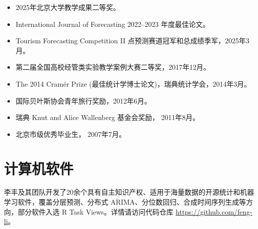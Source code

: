 \documentclass[twoside,a4paper,11pt]{article}
\begin{document}
\begin{refsection}
\begin{itemize}
\item 2025年北京大学教学成果二等奖。
\item International Journal of Forecasting 2022--2023 年度最佳论文。
\item Tourism Forecasting Competition II 点预测赛道冠军和总成绩季军，2025年3月。
\item 第二届全国高校经管类实验教学案例大赛二等奖，2017年12月。
\item The 2014 Cramér Prize (最佳统计学博士论文)，瑞典统计学会，2014年3月。
\item 国际贝叶斯协会青年旅行奖励，2012年6月。
\item 瑞典 Knut and Alice Wallenberg 基金会奖励， 2011年8月。
\item 北京市级优秀毕业生， 2007年7月。
\end{itemize}

\section{计算机软件}
李丰及其团队开发了20余个具有自主知识产权、适用于海量数据的开源统计和机器学习软件，覆盖分层预测、分布式 ARIMA、分位数回归、合成时间序列生成等方向，部分软件入选 R Task Views。详情请访问代码仓库 \url{https://github.com/feng-li}。


\end{refsection}
\end{document}
